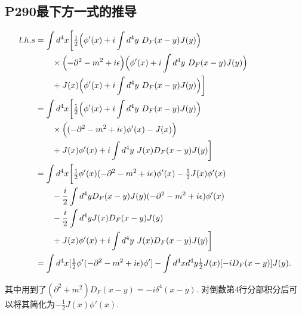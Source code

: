 \subsection{P290最下方一式的推导}\label{subsec: P290-derivation}
\begin{equation}
  \begin{aligned}
    l.h.s & = \int d^4 x \biggl[\tfrac{1}{2}\Bigl(\phi'(x) + i\int d^4y\ D_F(x-y)J(y)\Bigr)                                        \\
          & \qquad \times \Bigl(-\partial^2 - m^2 + i\epsilon\Bigr)\Bigl(\phi'(x) + i\int d^4y\ D_F(x-y)J(y)\Bigr)                 \\
          & \qquad + J(x)\Bigl(\phi'(x) + i\int d^4y\ D_F(x-y)J(y)\Bigr)\biggr]                                                    \\
          & = \int d^4 x \biggl[\tfrac{1}{2}\Bigl(\phi'(x) + i\int d^4y\ D_F(x-y)J(y)\Bigr)                                        \\
          & \qquad \times \Bigl((-\partial^2 - m^2 + i\epsilon)\phi'(x) - J(x)\Bigr)                                               \\
          & \qquad + J(x)\phi'(x) + i\int d^4y\ J(x)D_F(x-y)J(y)\biggr]                                                            \\
          & = \int d^4 x \biggl[\tfrac{1}{2}\phi'(x)(-\partial^2 - m^2 + i\epsilon)\phi'(x) - \tfrac{1}{2}J(x)\phi'(x)             \\
          & \qquad - \frac{i}{2}\int d^4y D_F(x-y)J(y)(-\partial^2 - m^2 + i\epsilon)\phi'(x)                                      \\
          & \qquad - \frac{i}{2}\int d^4y J(x)D_F(x-y)J(y)                                                                         \\
          & \qquad + J(x)\phi'(x) + i\int d^4y\ J(x)D_F(x-y)J(y)\biggr]                                                            \\
          & = \int d^4x [\tfrac{1}{2}\phi'(-\partial^2 - m^2 + i\epsilon)\phi'] - \int d^4x d^4y \tfrac{1}{2}J(x)[-iD_F(x-y)]J(y).
  \end{aligned}
\end{equation}

其中用到了$(\partial^2 + m^2)D_F(x-y) = -i\delta^4(x-y)$.
对倒数第4行分部积分后可以将其简化为$-\frac{1}{2}J(x)\phi'(x)$.


